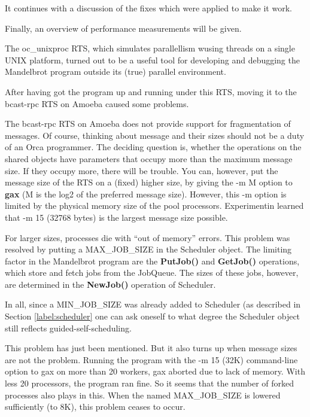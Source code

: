 It continues with a discussion of the fixes which were applied to make it work.

Finally, an overview of performance measurements will be given.


The oc\_unixproc RTS, which simulates parallellism wusing threads on 
a single UNIX platform, turned out to be a useful tool for developing and 
debugging the Mandelbrot program outside its (true) parallel environment.

After having got the program up and running under this RTS, moving it
to the bcast-rpc RTS \cite{orca-rts} on Amoeba caused some problems.


The bcast-rpc RTS on Amoeba does not provide support for fragmentation
of messages. Of course, thinking about message and their sizes should 
not be a duty of an Orca programmer.
\Skip
The deciding question is, whether the operations on the shared objects have 
parameters that occupy more than the maximum message size. 
\Skip
If they occupy more, there will be trouble. You can, however, put the
message size of the RTS on a (fixed) higher size, by giving the -m M option to 
{\bf gax} (M is the log2 of the preferred message size).
However, this -m option is limited by the physical memory size of the pool
processors. Experimentin learned that -m 15 (32768 bytes) is the largest 
message size possible.

For larger sizes, processes die with ``out of memory'' errors.  
\Skip
This problem was resolved by putting a MAX\_JOB\_SIZE in the Scheduler object.
The limiting factor in the Mandelbrot program are the {\bf PutJob()} and
{\bf GetJob()} operations, which store and fetch jobs from the JobQueue. The
sizes of these jobs, however, are determined in the {\bf NewJob()} operation
of Scheduler.

In all, since a MIN\_JOB\_SIZE was already added to Scheduler (as described
in Section \ref{label:scheduler} one can ask oneself to what degree the 
Scheduler object still reflects guided-self-scheduling.



This problem has just been mentioned. But it also turns up when message
sizes are not the problem. Running the program with the -m 15 (32K)
command-line option to gax on more than 20 workers, gax aborted due to lack
 of memory. With less 20 processors, the program ran fine. 
So it seems that the number of forked processes also plays in this.
\Skip
When the named MAX\_JOB\_SIZE is lowered sufficiently (to 8K), this 
problem ceases to occur.



